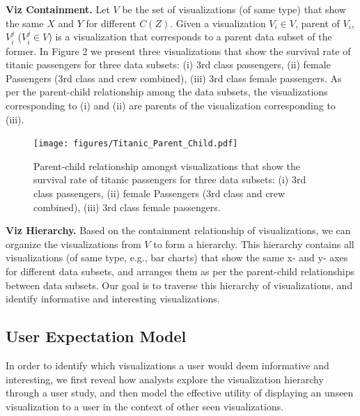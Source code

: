 \textbf{Viz Containment.} Let $V$ be the set of visualizations (of same type) that show the same $X$ and $Y$ for different $C(Z)$. Given a visualization $V_i \in V$, parent of $V_i$, $V_i^j$ ($V_i^j\in V$) is a visualization that corresponds to a parent data subset of the former. In Figure 2 we present three visualizations that show the survival rate of titanic passengers for three data subsets: (i) 3rd class passengers, (ii) female Passengers (3rd class and crew combined), (iii) 3rd class female passengers. As per the parent-child relationship among the data subsets, the visualizations corresponding to (i) and (ii) are parents of the visualization corresponding to (iii). %

\begin{figure}[bht]
\label{example}
\centering
\texttt{[image: figures/Titanic\_Parent\_Child.pdf]}
\caption{Parent-child relationship amongst visualizations that show the survival rate of titanic passengers for three data subsets: (i) 3rd class passengers, (ii) female Passengers (3rd class and crew combined), (iii) 3rd class female passengers.}
\end{figure}

\textbf{Viz Hierarchy.} Based on the containment relationship of visualizations, we can organize the visualizations from $V$ to form a hierarchy. This hierarchy contains all visualizations (of same type, e.g., bar charts) that show the same x- and y- axes for different data subsets, and arranges them as per the parent-child relationships between data subsets. Our goal is to traverse this hierarchy of visualizations, and identify informative and interesting visualizations.

\subsection{User Expectation Model}
In order to identify which visualizations a user would deem informative and interesting, we first reveal how analysts explore the visualization hierarchy through a user study, and then model the effective utility of displaying an unseen visualization to a user in the context of other seen visualizations. 
 
